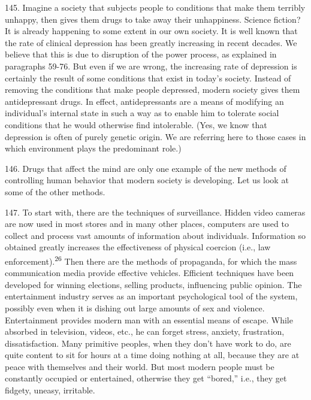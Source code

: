 \documentclass{article}
\begin{document}
145. Imagine a society that subjects people to conditions that make them terribly unhappy, then 
gives them drugs to take away their unhappiness. Science fiction? It is already happening to some 
extent in our own society. It is well known that the rate of clinical depression has been greatly 
increasing in recent decades. We believe that this is due to disruption of the power process, as 
explained in paragraphs 59-76. But even if we are wrong, the increasing rate of depression is 
certainly the result of some conditions that exist in today’s society. Instead of removing the 
conditions that make people depressed, modern society gives them antidepressant drugs. In effect, 
antidepressants are a means of modifying an individual’s internal state in such a way as to enable 
him to tolerate social conditions that he would otherwise find intolerable. (Yes, we know that 
depression is often of purely genetic origin. We are referring here to those cases in which 
environment plays the predominant role.) \vspace{\baselineskip}

146. Drugs that affect the mind are only one example of the new methods of controlling human 
behavior that modern society is developing. Let us look at some of the other methods. \vspace{\baselineskip} \newpage

147. To start with, there are the techniques of surveillance. Hidden video cameras are now used 
in most stores and in many other places, computers are used to collect and process vast amounts 
of information about individuals. Information so obtained greatly increases the effectiveness of 
physical coercion (i.e., law enforcement).\textsuperscript{26} Then there are the methods of propaganda, for which 
the mass communication media provide effective vehicles. Efficient techniques have been 
developed for winning elections, selling products, influencing public opinion. The entertainment 
industry serves as an important psychological tool of the system, possibly even when it is dishing 
out large amounts of sex and violence. Entertainment provides modern man with an essential 
means of escape. While absorbed in television, videos, etc., he can forget stress, anxiety, 
frustration, dissatisfaction. Many primitive peoples, when they don’t have work to do, are quite 
content to sit for hours at a time doing nothing at all, because they are at peace with themselves 
and their world. But most modern people must be constantly occupied or entertained, otherwise 
they get “bored,” i.e., they get fidgety, uneasy, irritable. \vspace{\baselineskip}
\end{document}
